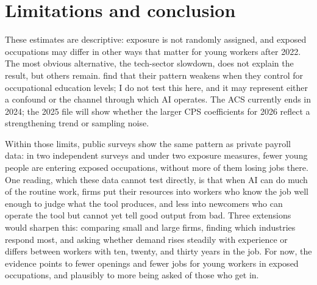 \documentclass[11pt]{article}
\begin{document}
\section{Limitations and conclusion}

These estimates are descriptive: exposure is not randomly assigned, and exposed occupations may differ in other ways that matter for young workers after 2022. The most obvious alternative, the tech-sector slowdown, does not explain the result, but others remain. \citet{brynjolfsson2026} find that their pattern weakens when they control for occupational education levels; I do not test this here, and it may represent either a confound or the channel through which AI operates. The ACS currently ends in 2024; the 2025 file will show whether the larger CPS coefficients for 2026 reflect a strengthening trend or sampling noise.

Within those limits, public surveys show the same pattern as private payroll data: in two independent surveys and under two exposure measures, fewer young people are entering exposed occupations, without more of them losing jobs there. One reading, which these data cannot test directly, is that when AI can do much of the routine work, firms put their resources into workers who know the job well enough to judge what the tool produces, and less into newcomers who can operate the tool but cannot yet tell good output from bad. Three extensions would sharpen this: comparing small and large firms, finding which industries respond most, and asking whether demand rises steadily with experience or differs between workers with ten, twenty, and thirty years in the job. For now, the evidence points to fewer openings and fewer jobs for young workers in exposed occupations, and plausibly to more being asked of those who get in.
\end{document}
